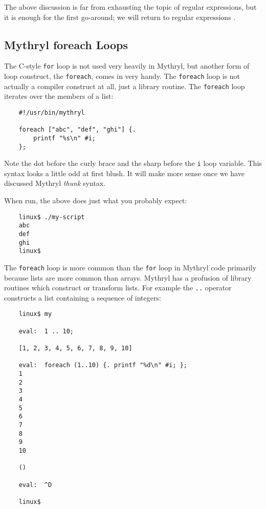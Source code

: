 The above discussion is far from exhausting the topic of regular 
expressions, but it is enough for the first go-around;  we will 
return to regular expressions .




\cutend*

\subsection{Mythryl foreach Loops}

The C-style {\tt for} loop is not used very heavily in Mythryl, but another 
form of loop construct, the {\tt foreach}, comes in very handy. 
The {\tt foreach} loop is not actually a compiler construct at all, just a library routine.  The 
{\tt foreach} loop iterates over the members of a list:

\begin{verbatim}
    #!/usr/bin/mythryl

    foreach ["abc", "def", "ghi"] {.
        printf "%s\n" #i;
    };
\end{verbatim}

Note the dot before the curly brace and the sharp before the {\tt i} 
loop variable.  This syntax looks a little odd at first blush. 
It will make more sense once we have discussed Mythryl {\it thunk} syntax. 

When run, the above does just what you probably expect:

\begin{verbatim}
    linux$ ./my-script
    abc
    def
    ghi
    linux$
\end{verbatim}

The {\tt foreach} loop is more common than the {\tt for} loop in  
Mythryl code primarily because lists are more common than arrays. 
Mythryl has a profusion of library routines 
which construct or transform lists.  For example the {\tt ..} operator 
constructs a list containing a sequence of integers:

\begin{verbatim}
    linux$ my

    eval:  1 .. 10;

    [1, 2, 3, 4, 5, 6, 7, 8, 9, 10]

    eval:  foreach (1..10) {. printf "%d\n" #i; };
    1
    2
    3
    4
    5
    6
    7
    8
    9
    10

    ()

    eval:  ^D

    linux$
\end{verbatim}

